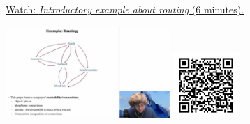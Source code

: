 
\begin{minipage}{10cm}
    \href{https://act4e-spring21.netlify.app/videos/spring2021-enrichment:intro-exa-enrich.html}{Watch: \emph{Introductory example about routing} (6 minutes).}
        
    \href{https://act4e-spring21.netlify.app/videos/spring2021-enrichment:intro-exa-enrich.html}{\includegraphics[height=3.5cm]{spring2021-enrichment:intro-exa-enrich/thumbnails.jpg}}
    \href{https://act4e-spring21.netlify.app/videos/spring2021-enrichment:intro-exa-enrich.html}{\includegraphics[height=2.5cm]{spring2021-enrichment:intro-exa-enrich/qrcode.png}}
\end{minipage}
